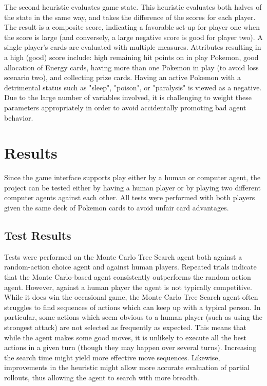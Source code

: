 \documentclass{article}
\begin{document}
The second heuristic evaluates game state.  This heuristic evaluates both halves of the state in the same way, and takes the difference of the scores for each player.  The result is a composite score, indicating a favorable set-up for player one when the score is large (and conversely, a large negative score is good for player two).  A single player's cards are evaluated with multiple measures.  Attributes resulting in a high (good) score include: high remaining hit points on in play Pokemon, good allocation of Energy cards, having more than one Pokemon in play (to avoid loss scenario two), and collecting prize cards.  Having an active Pokemon with a detrimental status such as "sleep", "poison", or "paralysis" is viewed as a negative.  Due to the large number of variables involved, it is challenging to weight these parameters appropriately in order to avoid accidentally promoting bad agent behavior.

\section{Results} %
Since the game interface supports play either by a human or computer agent, the project can be tested either by having a human player or by playing two different computer agents against each other.  All tests were performed with both players given the same deck of Pokemon cards to avoid unfair card advantages.

\subsection{Test Results} %
Tests were performed on the Monte Carlo Tree Search agent both against a random-action choice agent and against human players.  Repeated trials indicate that the Monte Carlo-based agent consistently outperforms the random action agent.  However, against a human player the agent is not typically competitive.  While it does win the occasional game, the Monte Carlo Tree Search agent often struggles to find sequences of actions which can keep up with a typical person.  In particular, some actions which seem obvious to a human player (such as using the strongest attack) are not selected as frequently as expected.  This means that while the agent makes some good moves, it is unlikely to execute all the best actions in a given turn (though they may happen over several turns).  Increasing the search time might yield more effective move sequences.  Likewise, improvements in the heuristic might allow more accurate evaluation of partial rollouts, thus allowing the agent to search with more breadth.
\end{document}
